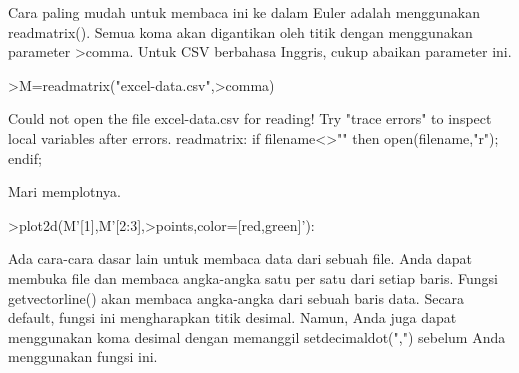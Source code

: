 \documentclass[12pt,arial,letterpaper]{book}
\begin{document}
\begin{eulercomment}
\begin{eulercomment}
\begin{eulercomment}
\begin{eulercomment}
\begin{eulercomment}
\begin{eulercomment}
\begin{eulercomment}
\begin{eulercomment}
\begin{eulercomment}
\begin{eulercomment}
\begin{eulercomment}
\begin{eulercomment}
\begin{eulercomment}
\begin{eulercomment}
\begin{eulercomment}
\begin{eulercomment}
\begin{eulercomment}
\begin{eulercomment}
\begin{eulercomment}
\begin{eulercomment}
\begin{eulercomment}
\begin{eulercomment}
\begin{eulercomment}
\begin{eulercomment}
\begin{eulercomment}
\begin{eulercomment}
\begin{eulercomment}
\begin{eulercomment}
\begin{eulercomment}
\begin{eulercomment}
\begin{eulercomment}
\begin{eulercomment}
\begin{eulercomment}
\begin{eulercomment}
\begin{eulercomment}
\begin{eulercomment}
\begin{eulercomment}
\begin{eulercomment}
\begin{eulercomment}
Cara paling mudah untuk membaca ini ke dalam Euler adalah menggunakan
readmatrix(). Semua koma akan digantikan oleh titik dengan menggunakan
parameter \textgreater{}comma. Untuk CSV berbahasa Inggris, cukup abaikan parameter
ini.
\end{eulercomment}
\begin{eulerprompt}
>M=readmatrix("excel-data.csv",>comma)
\end{eulerprompt}
\begin{euleroutput}
  Could not open the file
  excel-data.csv
  for reading!
  Try "trace errors" to inspect local variables after errors.
  readmatrix:
      if filename<>"" then open(filename,"r"); endif;
\end{euleroutput}
\begin{eulercomment}
Mari memplotnya.
\end{eulercomment}
\begin{eulerprompt}
>plot2d(M'[1],M'[2:3],>points,color=[red,green]'):
\end{eulerprompt}
\begin{eulercomment}
Ada cara-cara dasar lain untuk membaca data dari sebuah file. Anda
dapat membuka file dan membaca angka-angka satu per satu dari setiap
baris. Fungsi getvectorline() akan membaca angka-angka dari sebuah
baris data. Secara default, fungsi ini mengharapkan titik desimal.
Namun, Anda juga dapat menggunakan koma desimal dengan memanggil
setdecimaldot(",") sebelum Anda menggunakan fungsi ini.


\end{eulercomment}
\end{eulercomment}
\end{eulercomment}
\end{eulercomment}
\end{eulercomment}
\end{eulercomment}
\end{eulercomment}
\end{eulercomment}
\end{eulercomment}
\end{eulercomment}
\end{eulercomment}
\end{eulercomment}
\end{eulercomment}
\end{eulercomment}
\end{eulercomment}
\end{eulercomment}
\end{eulercomment}
\end{eulercomment}
\end{eulercomment}
\end{eulercomment}
\end{eulercomment}
\end{eulercomment}
\end{eulercomment}
\end{eulercomment}
\end{eulercomment}
\end{eulercomment}
\end{eulercomment}
\end{eulercomment}
\end{eulercomment}
\end{eulercomment}
\end{eulercomment}
\end{eulercomment}
\end{eulercomment}
\end{eulercomment}
\end{eulercomment}
\end{eulercomment}
\end{eulercomment}
\end{eulercomment}
\end{eulercomment}
\end{document}
